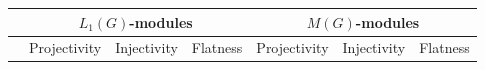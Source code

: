 \begin{scriptsize}
\begin{longtable}{|c|c|c|c|c|c|c|}
\hline            & \multicolumn{3}{c|}{$L_1(G)$-modules}                                                                                                                                                                                                                                                                                                                                                                                                                                                                     & \multicolumn{3}{c|}{$M(G)$-modules}                                                                                                                                                                                                                                                                                                                                                                                                                                                                  \\
\hline
                  & \mbox{Projectivity}                                                                                                                                               & \mbox{Injectivity}                                                                                                                                                & \mbox{Flatness}                                                                                                                                                    & \mbox{Projectivity}                                                                                                                                               & \mbox{Injectivity}                                                                                                                                                & \mbox{Flatness}                                                                                                                                                   \\ 
\hline

\end{longtable}
\end{scriptsize}

